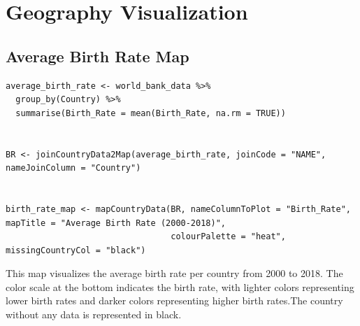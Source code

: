 \documentclass{article}\usepackage[]{graphicx}\usepackage[]{xcolor}
\begin{document}
\newpage
\section{Geography Visualization}
\subsection{Average Birth Rate Map}
\begin{lstlisting}
average_birth_rate <- world_bank_data %>%
  group_by(Country) %>%
  summarise(Birth_Rate = mean(Birth_Rate, na.rm = TRUE))


BR <- joinCountryData2Map(average_birth_rate, joinCode = "NAME", nameJoinColumn = "Country")


birth_rate_map <- mapCountryData(BR, nameColumnToPlot = "Birth_Rate", mapTitle = "Average Birth Rate (2000-2018)", 
                                 colourPalette = "heat", missingCountryCol = "black")

\end{lstlisting}
This map visualizes the average birth rate per country from 2000 to 2018. The color scale at the bottom indicates the birth rate, with lighter colors representing lower birth rates and darker colors representing higher birth rates.The country without any data is represented in black.
\newpage
\end{document}
